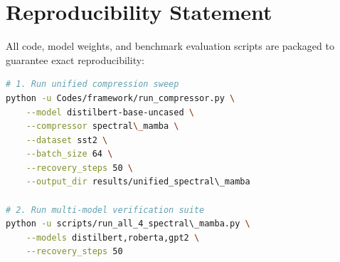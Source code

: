 \section{Reproducibility Statement}
All code, model weights, and benchmark evaluation scripts are packaged to guarantee exact reproducibility:
\begin{lstlisting}[language=bash]
# 1. Run unified compression sweep
python -u Codes/framework/run_compressor.py \
    --model distilbert-base-uncased \
    --compressor spectral\_mamba \
    --dataset sst2 \
    --batch_size 64 \
    --recovery_steps 50 \
    --output_dir results/unified_spectral\_mamba

# 2. Run multi-model verification suite
python -u scripts/run_all_4_spectral\_mamba.py \
    --models distilbert,roberta,gpt2 \
    --recovery_steps 50
\end{lstlisting}
